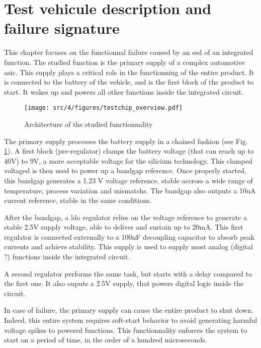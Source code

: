 \section{Test vehicule description and failure signature}

This chapter focuses on the functionnal failure caused by an \gls{esd} of an integrated function.
The studied function is the primary supply of a complex automotive \gls{asic}.
This supply plays a critical role in the functionning of the entire product.
It is connected to the battery of the vehicle, and is the first block of the product to start.
It wakes up and powers all other functions inside the integrated circuit.

\begin{figure}[h]
  \centering
  \texttt{[image: src/4/figures/testchip\_overview.pdf]}
  \caption{Architecture of the studied functionnality}
  \label{testchip_overview}
\end{figure}

The primary supply processes the battery supply in a chained fashion (see Fig. \ref{testchip_overview}).
A first block (pre-regulator) clamps the battery voltage (that can reach up to 40V) to 9V, a more acceptable voltage for the silicium technology.
This clamped voltaged is then used to power up a bandgap reference.
Once properly started, this bandgap generates a 1.23 V voltage reference, stable accross a wide range of temperature, process variation and mismatchs.
The bandgap also outputs a 10uA current reference, stable in the same conditions.

After the bandgap, a \gls{ldo} regulator relies on the voltage reference to generate a stable 2.5V supply voltage, able to deliver and sustain up to 20mA.
This first regulator is connected externally to a 100nF decoupling capacitor to absorb peak currents and achieve stability.
This supply is used to supply most analog (digital ?) functions inside the integrated circuit.

A second regulator performs the same task, but starts with a delay compared to the first one.
It also ouputs a 2.5V supply, that powers digital logic inside the circuit.

In case of failure, the primary supply can cause the entire product to shut down.
Indeed, this entire system requires soft-start behavior to avoid generating harmful voltage spikes to powered functions.
This functionnality enforces the system to start on a  period of time, in the order of a hundred microseconds.


